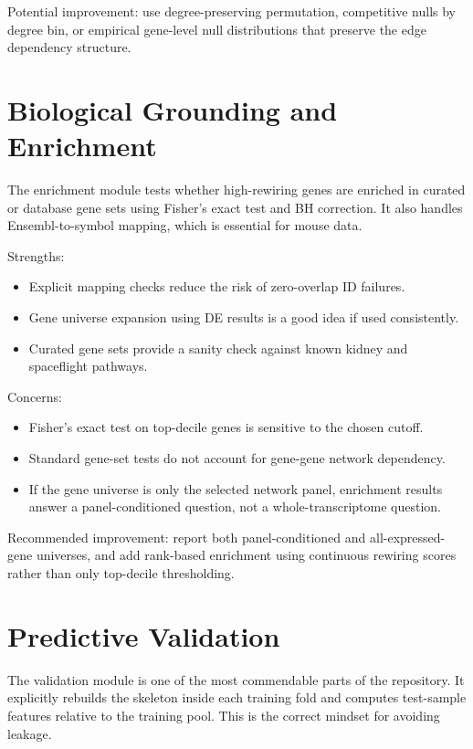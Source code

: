 \documentclass[11pt]{article}
\begin{document}
Potential improvement: use degree-preserving permutation, competitive nulls by degree bin, or empirical gene-level null distributions that preserve the edge dependency structure.

\section{Biological Grounding and Enrichment}

The enrichment module tests whether high-rewiring genes are enriched in curated or database gene sets using Fisher's exact test and BH correction.  It also handles Ensembl-to-symbol mapping, which is essential for mouse data.

Strengths:
\begin{itemize}[leftmargin=1.5em]
    \item Explicit mapping checks reduce the risk of zero-overlap ID failures.
    \item Gene universe expansion using DE results is a good idea if used consistently.
    \item Curated gene sets provide a sanity check against known kidney and spaceflight pathways.
\end{itemize}

Concerns:
\begin{itemize}[leftmargin=1.5em]
    \item Fisher's exact test on top-decile genes is sensitive to the chosen cutoff.
    \item Standard gene-set tests do not account for gene-gene network dependency.
    \item If the gene universe is only the selected network panel, enrichment results answer a panel-conditioned question, not a whole-transcriptome question.
\end{itemize}

Recommended improvement: report both panel-conditioned and all-expressed-gene universes, and add rank-based enrichment using continuous rewiring scores rather than only top-decile thresholding.

\section{Predictive Validation}

The validation module is one of the most commendable parts of the repository.  It explicitly rebuilds the skeleton inside each training fold and computes test-sample features relative to the training pool.  This is the correct mindset for avoiding leakage.
\end{document}
